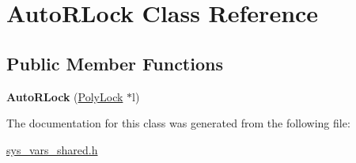 \hypertarget{classAutoRLock}{}\section{Auto\+R\+Lock Class Reference}
\label{classAutoRLock}
\subsection*{Public Member Functions}
\begin{DoxyCompactItemize}
\item 
\mbox{\label{classAutoRLock_a79af3eb9e60d2e52928d349915346053}} 
{\bfseries Auto\+R\+Lock} (\mbox{\hyperlink{classPolyLock}{Poly\+Lock}} $\ast$l)
\end{DoxyCompactItemize}


The documentation for this class was generated from the following file\+:\begin{DoxyCompactItemize}
\item 
\mbox{\hyperlink{sys__vars__shared_8h}{sys\+\_\+vars\+\_\+shared.\+h}}\end{DoxyCompactItemize}
